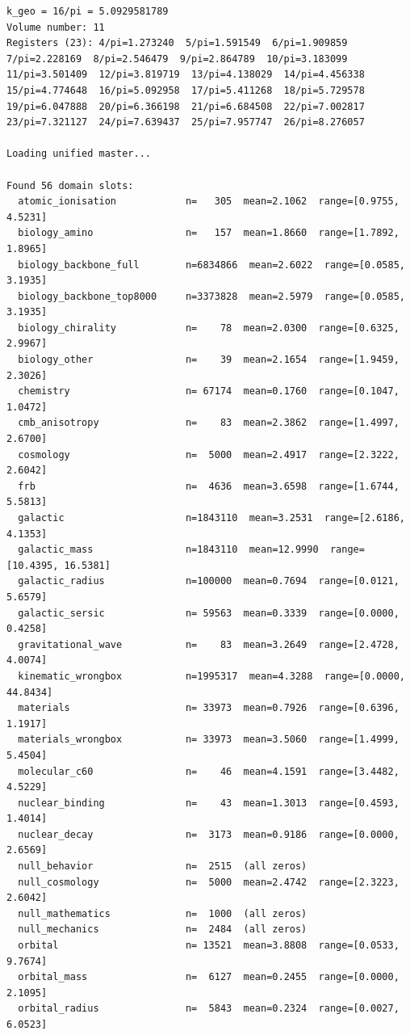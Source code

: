 \documentclass[11pt, letterpaper, openany]{book}
\begin{document}
\begin{empiricalbox}
\begin{lstlisting}[style=terminal]
k_geo = 16/pi = 5.0929581789
Volume number: 11
Registers (23): 4/pi=1.273240  5/pi=1.591549  6/pi=1.909859  7/pi=2.228169  8/pi=2.546479  9/pi=2.864789  10/pi=3.183099  11/pi=3.501409  12/pi=3.819719  13/pi=4.138029  14/pi=4.456338  15/pi=4.774648  16/pi=5.092958  17/pi=5.411268  18/pi=5.729578  19/pi=6.047888  20/pi=6.366198  21/pi=6.684508  22/pi=7.002817  23/pi=7.321127  24/pi=7.639437  25/pi=7.957747  26/pi=8.276057

Loading unified master...

Found 56 domain slots:
  atomic_ionisation            n=   305  mean=2.1062  range=[0.9755, 4.5231]
  biology_amino                n=   157  mean=1.8660  range=[1.7892, 1.8965]
  biology_backbone_full        n=6834866  mean=2.6022  range=[0.0585, 3.1935]
  biology_backbone_top8000     n=3373828  mean=2.5979  range=[0.0585, 3.1935]
  biology_chirality            n=    78  mean=2.0300  range=[0.6325, 2.9967]
  biology_other                n=    39  mean=2.1654  range=[1.9459, 2.3026]
  chemistry                    n= 67174  mean=0.1760  range=[0.1047, 1.0472]
  cmb_anisotropy               n=    83  mean=2.3862  range=[1.4997, 2.6700]
  cosmology                    n=  5000  mean=2.4917  range=[2.3222, 2.6042]
  frb                          n=  4636  mean=3.6598  range=[1.6744, 5.5813]
  galactic                     n=1843110  mean=3.2531  range=[2.6186, 4.1353]
  galactic_mass                n=1843110  mean=12.9990  range=[10.4395, 16.5381]
  galactic_radius              n=100000  mean=0.7694  range=[0.0121, 5.6579]
  galactic_sersic              n= 59563  mean=0.3339  range=[0.0000, 0.4258]
  gravitational_wave           n=    83  mean=3.2649  range=[2.4728, 4.0074]
  kinematic_wrongbox           n=1995317  mean=4.3288  range=[0.0000, 44.8434]
  materials                    n= 33973  mean=0.7926  range=[0.6396, 1.1917]
  materials_wrongbox           n= 33973  mean=3.5060  range=[1.4999, 5.4504]
  molecular_c60                n=    46  mean=4.1591  range=[3.4482, 4.5229]
  nuclear_binding              n=    43  mean=1.3013  range=[0.4593, 1.4014]
  nuclear_decay                n=  3173  mean=0.9186  range=[0.0000, 2.6569]
  null_behavior                n=  2515  (all zeros)
  null_cosmology               n=  5000  mean=2.4742  range=[2.3223, 2.6042]
  null_mathematics             n=  1000  (all zeros)
  null_mechanics               n=  2484  (all zeros)
  orbital                      n= 13521  mean=3.8808  range=[0.0533, 9.7674]
  orbital_mass                 n=  6127  mean=0.2455  range=[0.0000, 2.1095]
  orbital_radius               n=  5843  mean=0.2324  range=[0.0027, 6.0523]

\end{lstlisting}
\end{empiricalbox}
\end{document}
